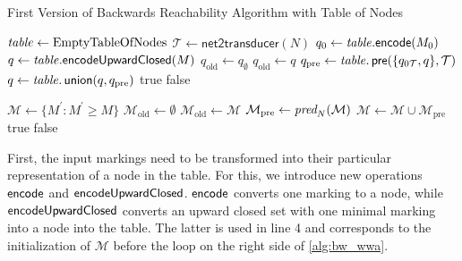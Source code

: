 \begin{algorithm}[htb]
\caption{First Version of Backwards Reachability Algorithm with Table of Nodes}\label{alg:bw_wwa}
\begin{minipage}[t]{0.6\textwidth}
\begin{algorithmic}[1]\smallskip
{}
\State $\mathit{table} \gets \text{EmptyTableOfNodes}$
\State $\mathcal{T} \gets \textsf{net2transducer}(N)$
\State $q_{0} \gets  \mathit{table}.\textsf{encode}(M_{0})$
\State $q \gets \mathit{table}.\textsf{encodeUpwardClosed}(M)$
\State $q_{\text{old}} \gets q_{\emptyset}$
	\State $q_{\text{old}}  \gets q$
	\State $q_{\text{pre}} \gets \mathit{table}.\operatorname{\textsf{pre}}(\{q_{0\mathcal{T}},q\},\mathcal{T})$
	\State $q \gets \mathit{table}.\operatorname{\textsf{union}}(q, q_{\text{pre}})$
	\Return true
\EndIf
{}
    \Return false
\EndIf
\EndWhile
\smallskip
\end{algorithmic}
\end{minipage}
\begin{algocolor}
\begin{minipage}[t]{0.37\textwidth}
\begin{algorithmic}\smallskip
{}
\State 
\State 
\State 
\State $\mathcal{M} \gets \{ M^{'} : M^{'} \ge M \}$
\State $\mathcal{M}_{\text{old}} \gets \emptyset$
	\State $\mathcal{M}_{\text{old}} \gets \mathcal{M}$
	\State $\mathcal{M}_{\text{pre}} \gets \operatorname{\textit{pred}}_{N}(\mathcal{M})$
	\State $\mathcal{M} \gets \mathcal{M}  \cup \mathcal{M}_{\text{pre}}$
	\Return true
\EndIf
{}
    \Return false
\EndIf
\EndWhile
\smallskip
\end{algorithmic}
\end{minipage}
\end{algocolor}
\end{algorithm}

First, the input markings need to be transformed into their particular representation of a node in the table.
For this, we introduce new operations $\operatorname{\textsf{encode}}$ and $\operatorname{\textsf{encodeUpwardClosed}}$. $\operatorname{\textsf{encode}}$ converts one marking to a node, while $\operatorname{\textsf{encodeUpwardClosed}}$ converts an upward closed set with one minimal marking into a node into the table. The latter is used in line 4 and corresponds to the initialization of $\mathcal{M}$ before the loop on the right side of \autoref{alg:bw_wwa}.

\par

